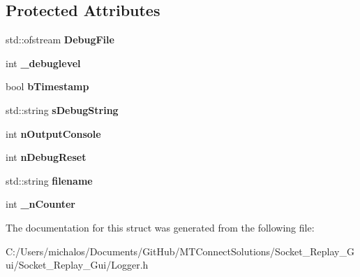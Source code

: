 \subsection*{Protected Attributes}
\begin{DoxyCompactItemize}
\item 
\hypertarget{struct_logging_1_1_c_logger_a39bc9c140ad1edab493e21a8f041d2f4}{}std\+::ofstream {\bfseries Debug\+File}\label{struct_logging_1_1_c_logger_a39bc9c140ad1edab493e21a8f041d2f4}

\item 
\hypertarget{struct_logging_1_1_c_logger_a67ca0c7dd10ea47165866add980a7f20}{}int {\bfseries \+\_\+debuglevel}\label{struct_logging_1_1_c_logger_a67ca0c7dd10ea47165866add980a7f20}

\item 
\hypertarget{struct_logging_1_1_c_logger_a7ff1bc9d706572877c39bc05f68b9c70}{}bool {\bfseries b\+Timestamp}\label{struct_logging_1_1_c_logger_a7ff1bc9d706572877c39bc05f68b9c70}

\item 
\hypertarget{struct_logging_1_1_c_logger_a347743d6e98110209271779aec9739dc}{}std\+::string {\bfseries s\+Debug\+String}\label{struct_logging_1_1_c_logger_a347743d6e98110209271779aec9739dc}

\item 
\hypertarget{struct_logging_1_1_c_logger_a14ba10122ca9867f85da0e9da3850f14}{}int {\bfseries n\+Output\+Console}\label{struct_logging_1_1_c_logger_a14ba10122ca9867f85da0e9da3850f14}

\item 
\hypertarget{struct_logging_1_1_c_logger_a8c1376b11177d8c7222481eb5d363cc0}{}int {\bfseries n\+Debug\+Reset}\label{struct_logging_1_1_c_logger_a8c1376b11177d8c7222481eb5d363cc0}

\item 
\hypertarget{struct_logging_1_1_c_logger_a8139721c43896d2bd418a304dcaeec7a}{}std\+::string {\bfseries filename}\label{struct_logging_1_1_c_logger_a8139721c43896d2bd418a304dcaeec7a}

\item 
\hypertarget{struct_logging_1_1_c_logger_aaf2d37e1e0fec2ee9cb9331f77bb0426}{}int {\bfseries \+\_\+n\+Counter}\label{struct_logging_1_1_c_logger_aaf2d37e1e0fec2ee9cb9331f77bb0426}

\end{DoxyCompactItemize}


The documentation for this struct was generated from the following file\+:\begin{DoxyCompactItemize}
\item 
C\+:/\+Users/michalos/\+Documents/\+Git\+Hub/\+M\+T\+Connect\+Solutions/\+Socket\+\_\+\+Replay\+\_\+\+Gui/\+Socket\+\_\+\+Replay\+\_\+\+Gui/Logger.\+h\end{DoxyCompactItemize}

